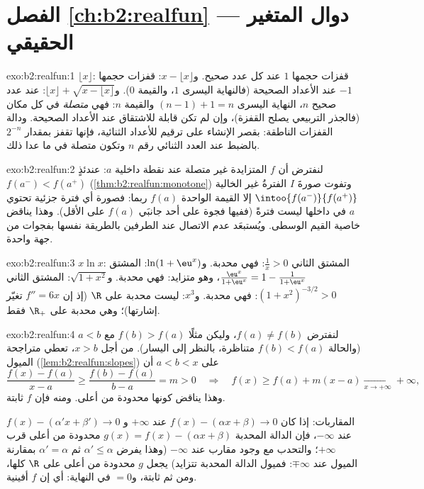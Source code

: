 \section*{الفصل \ref{ch:b2:realfun} --- دوال المتغير الحقيقي}

\begin{solution}{exo:b2:realfun:1}
$\lfloor x\rfloor$: قفزات حجمها $1$ عند كل عدد صحيح. و$x -
\lfloor x\rfloor$: قفزات حجمها $-1$ عند الأعداد الصحيحة (فالنهاية اليسرى $1$،
والقيمة $0$). و$\lfloor x\rfloor + \sqrt{x - \lfloor x\rfloor}$: عند عدد
صحيح $n$، النهاية اليسرى $(n - 1) + 1 = n$ والقيمة $n$:
فهي \emph{متصلة} في كل مكان (فالجذر التربيعي يصلح القفزة)،
وإن لم تكن قابلة للاشتقاق عند الأعداد الصحيحة. ودالة القفزات الناطقة:
بقصر الإنشاء على ترقيم للأعداد الثنائية، فإنها
تقفز بمقدار $2^{-n}$ بالضبط عند العدد الثنائي رقم $n$ وتكون
متصلة في ما عدا ذلك.
\end{solution}

\begin{solution}{exo:b2:realfun:2}
لنفترض أن $f$ المتزايدة غير متصلة عند نقطة داخلية $a$: عندئذٍ
$f(a^-) < f(a^+)$ (\cref{thm:b2:realfun:monotone}) وتفوت صورةَ
$I$ الفترةُ  غير الخالية
$\intoo{f(a^-)}{f(a^+)}$ إلا القيمة الواحدة $f(a)$ ربما:
فصورة أي فترة جزئية تحتوي $a$ في داخلها ليست
فترةً (ففيها فجوة على أحد جانبَي $f(a)$ على الأقل). وهذا
يناقض خاصية القيم الوسطى. ويُستبعَد عدم الاتصال
عند الطرفين بالطريقة نفسها بفجوات من جهة واحدة.
\end{solution}

\begin{solution}{exo:b2:realfun:3}
$x\ln x$: المشتق الثاني $\frac1x > 0$: فهي محدبة. و$\ln(1 +
\eu^x)$: المشتق $\frac{\eu^x}{1 + \eu^x} = 1 - \frac{1}{1 +
\eu^x}$، وهو متزايد: فهي محدبة. و$\sqrt{1 + x^2}$: المشتق الثاني
$(1 + x^2)^{-3/2} > 0$: فهي محدبة. و$x^3$: ليست محدبة على $\R$ (إذ إن $f'' =
6x$ تغيّر إشارتها)؛ وهي محدبة على $\R_+$ فقط.
\end{solution}

\begin{solution}{exo:b2:realfun:4}
لنفترض $f(a) \neq f(b)$، وليكن مثلًا $f(b) > f(a)$ مع $a < b$ (والحالة
$f(b) < f(a)$ متناظرة، بالنظر إلى اليسار). من أجل $x > b$، تعطي متراجحة
الميول (\cref{lem:b2:realfun:slopes}) على $a < b < x$ أن
\[
\frac{f(x) - f(a)}{x - a} \geq \frac{f(b) - f(a)}{b - a} = m > 0
\quad\Longrightarrow\quad
f(x) \geq f(a) + m(x - a) \xrightarrow[x\to+\infty]{} +\infty,
\]
وهذا يناقض كونها محدودة من أعلى. ومنه فإن $f$ ثابتة.

المقاربات: إذا كان $f(x) - (\alpha x + \beta) \to 0$ عند $+\infty$ و
$f(x) - (\alpha' x + \beta') \to 0$ عند $-\infty$، فإن الدالة المحدبة
$g(x) = f(x) - (\alpha x + \beta)$ محدودة من أعلى قرب
$+\infty$؛ والتحدب مع وجود مقارب عند $-\infty$ (وهذا يفرض
$\alpha' \leq \alpha$ ثم $\alpha' = \alpha$ بمقارنة الميول عند
$\mp\infty$: فميول الدالة المحدبة تتزايد) يجعل $g$
محدودة من أعلى على $\R$ كلها، ومن ثم ثابتة، و$= 0$ في النهاية: أي إن $f$
أفينية.
\end{solution}


